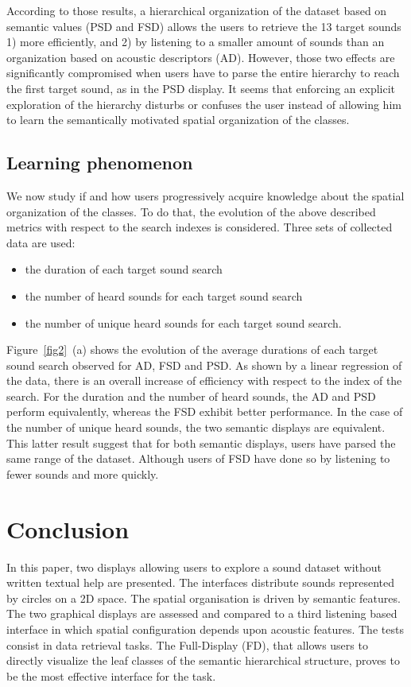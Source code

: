 \documentclass{aes2e}
\begin{document}
According to those results, a hierarchical organization of the dataset based on semantic values (PSD and FSD) allows the users to retrieve the 13 target sounds 1) more efficiently, and 2) by listening to a smaller amount of sounds than an organization based on acoustic descriptors (AD). However, those two effects are significantly compromised when users have to parse the entire hierarchy to reach the first target sound, as in the PSD display. It seems that enforcing an explicit exploration of the hierarchy disturbs or confuses the user instead of allowing him to learn the semantically motivated spatial organization of the classes. 


\subsection{Learning phenomenon}

We now study if and how users  progressively acquire knowledge about the spatial organization of the classes. To do that, the evolution of the above described metrics with respect to the search indexes is considered. Three sets of collected data are used:

\begin{itemize}
\item the duration of each target sound search 
\item the number of heard sounds for each target sound search 
\item the number of unique heard sounds for each target sound search. 
\end{itemize}

Figure~\ref{fig2}~(a) shows the evolution of the average durations of each target sound search observed for AD, FSD and PSD. As shown by a linear regression of the data, there is an overall increase of efficiency with respect to the index of the search. For the duration and the number of heard sounds, the AD and PSD perform equivalently, whereas the FSD exhibit better performance. In the case of the number of unique heard sounds, the two semantic displays are equivalent. This latter result suggest that for both semantic displays, users have parsed the same range of the dataset. Although users of FSD have done so by listening to fewer sounds and more quickly. 

\section{Conclusion}

In this paper, two displays allowing users to explore a sound dataset without written textual help are presented. The interfaces distribute sounds represented by circles on a 2D space. The spatial organisation is driven by semantic features. The two graphical displays are assessed and compared to a third listening based interface in which spatial configuration depends upon acoustic features. The tests consist in data retrieval tasks. 
The Full-Display (FD), that allows users to directly visualize the leaf classes of the semantic hierarchical structure, proves to be the most effective interface for the task.
\end{document}
